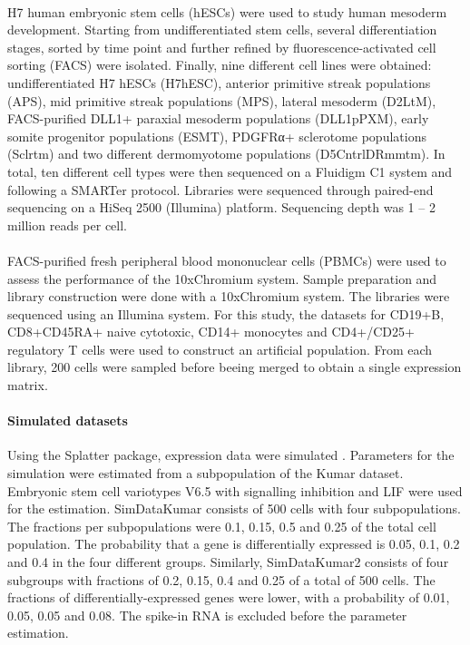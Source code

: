 \documentclass[11pt, a4paper]{article}\usepackage[]{graphicx}\usepackage[]{color}
\begin{document}
\paragraph{\citet{koh2016atlas} }
H7 human embryonic stem cells (hESCs) were used to study human mesoderm development. Starting from undifferentiated stem cells, several differentiation stages, sorted by time point and further refined by fluorescence-activated cell sorting (FACS) were isolated. Finally, nine different cell lines were obtained:  undifferentiated H7 hESCs (H7hESC), anterior primitive streak populations (APS), mid primitive streak populations (MPS), lateral mesoderm (D2LtM), FACS-purified DLL1+ paraxial mesoderm populations (DLL1pPXM), early somite progenitor populations (ESMT), PDGFRα+ sclerotome populations (Sclrtm) and two different dermomyotome populations (D5CntrlDRmmtm).
In total, ten different cell types were then sequenced on a Fluidigm C1 system and following a SMARTer protocol. Libraries were sequenced through paired-end sequencing on a HiSeq 2500 (Illumina) platform. Sequencing depth was 1 -- 2 million reads per cell. 
\paragraph{ \citet{zheng2017massively}}
FACS-purified fresh peripheral blood mononuclear cells (PBMCs) were used to assess the performance of the 10xChromium system. Sample preparation and library construction were done with a 10xChromium system. The libraries were sequenced using an Illumina system. For this study, the datasets for CD19+B, CD8+CD45RA+ naive cytotoxic, CD14+ monocytes and CD4+/CD25+ regulatory T cells were used to construct an artificial population. From each library, 200 cells were sampled before beeing merged to obtain a single expression matrix.
\paragraph{Simulated datasets }
Using the Splatter package, expression data were simulated \citep{oshlack2017splatter}. Parameters for the simulation were estimated from a subpopulation of the Kumar dataset.  Embryonic stem cell variotypes V6.5 with signalling inhibition and LIF were used for the estimation. SimDataKumar consists of 500 cells with four subpopulations. The fractions per subpopulations were 0.1, 0.15, 0.5 and 0.25 of the total cell population. The probability that a gene is differentially expressed is 0.05, 0.1, 0.2 and 0.4 in the four different groups. Similarly, SimDataKumar2 consists of four subgroups with fractions of 0.2, 0.15, 0.4 and 0.25 of a total of 500 cells. The fractions of differentially-expressed genes were lower, with a probability of 0.01, 0.05, 0.05 and 0.08. The spike-in RNA is excluded before the parameter estimation.
\end{document}
